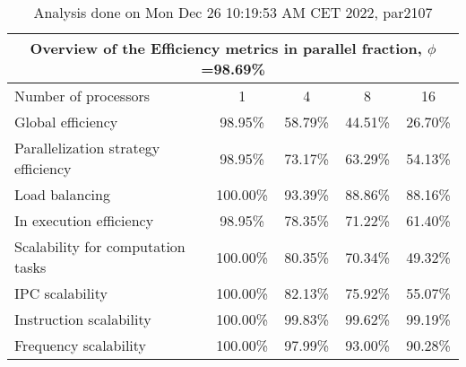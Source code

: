 \begin{table}[h]
\begin{center}
\begin{tabular}{|l|c|c|c|c|}
\hline
\multicolumn{5}{|c|}{Overview of the Efficiency metrics in parallel fraction, $\phi$=98.69\%} \\
\hline
\hline
Number of processors & 1 & 4 & 8 & 16 \\
\hline
\hline
Global efficiency                      &     98.95\% &     58.79\% &     44.51\% &     26.70\% \\
\hline
\hline
Parallelization strategy efficiency &     98.95\% &     73.17\% &     63.29\% &     54.13\% \\
\hline
Load balancing                   &    100.00\% &     93.39\% &     88.86\% &     88.16\% \\
In execution efficiency          &     98.95\% &     78.35\% &     71.22\% &     61.40\% \\
\hline
\hline
Scalability for computation tasks   &    100.00\% &     80.35\% &     70.34\% &     49.32\% \\
\hline
IPC scalability                  &    100.00\% &     82.13\% &     75.92\% &     55.07\% \\
Instruction scalability          &    100.00\% &     99.83\% &     99.62\% &     99.19\% \\
Frequency scalability            &    100.00\% &     97.99\% &     93.00\% &     90.28\% \\
\hline
\end{tabular}
\end{center}
\caption{ Analysis done on Mon Dec 26 10:19:53 AM CET 2022, par2107}
\end{table}
